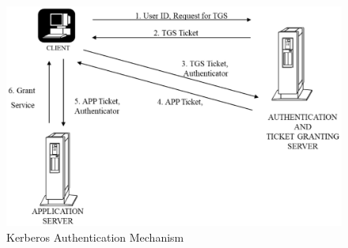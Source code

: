 \medskip

\begin{figure}[!ht]
\centering
\includegraphics[scale=.85]{src/Figures/chap2/3.eps}
\caption{Kerberos Authentication Mechanism}\label{chap2-fig3}
\end{figure}

\newpage


